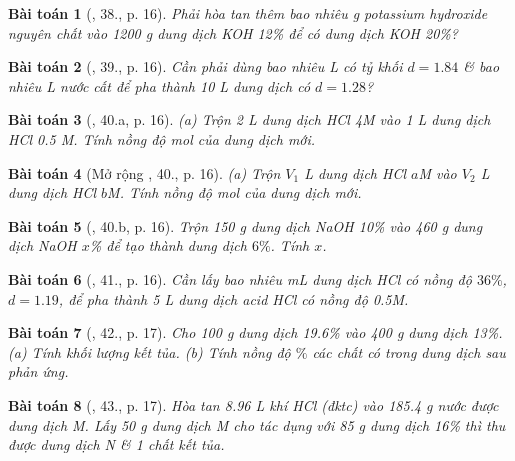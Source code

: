 \documentclass{article}
\newtheorem{baitoan}{Bài toán}
\begin{document}
\begin{baitoan}[\cite{An_400_BT_Hoa_Hoc_9}, 38., p. 16]
	Phải hòa tan thêm bao nhiêu {\rm g} potassium hydroxide nguyên chất vào {\rm1200 g} dung dịch {\rm KOH 12\%} để có dung dịch {\rm KOH 20\%}?
\end{baitoan}

\begin{baitoan}[\cite{An_400_BT_Hoa_Hoc_9}, 39., p. 16]
	Cần phải dùng bao nhiêu {\rm L } có tỷ khối $d = 1.84$ \& bao nhiêu {\rm L} nước cất để pha thành {\rm10 L} dung dịch {\rm{}} có $d = 1.28$?
\end{baitoan}

\begin{baitoan}[\cite{An_400_BT_Hoa_Hoc_9}, 40.a, p. 16]
	(a) Trộn {\rm2 L} dung dịch {\rm HCl 4M} vào {\rm 1 L} dung dịch {\rm HCl 0.5 M}. Tính nồng độ mol của dung dịch mới.
\end{baitoan}

\begin{baitoan}[Mở rộng \cite{An_400_BT_Hoa_Hoc_9}, 40., p. 16]
	(a) Trộn $V_1$ {\rm L} dung dịch {\rm HCl $a$M} vào $V_2$ {\rm L} dung dịch {\rm HCl $b$M}. Tính nồng độ mol của dung dịch mới.
\end{baitoan}

\begin{baitoan}[\cite{An_400_BT_Hoa_Hoc_9}, 40.b, p. 16]
	Trộn {\rm150 g} dung dịch {\rm NaOH 10\%} vào {\rm460 g} dung dịch {\rm NaOH $x$\%} để tạo thành dung dịch $6\%$. Tính $x$.
\end{baitoan}

\begin{baitoan}[\cite{An_400_BT_Hoa_Hoc_9}, 41., p. 16]
	Cần lấy bao nhiêu {\rm mL} dung dịch {\rm HCl} có nồng độ $36\%$, $d = 1.19$, để pha thành {\rm5 L} dung dịch acid {\rm HCl} có nồng độ {\rm0.5M}.
\end{baitoan}

\begin{baitoan}[\cite{An_400_BT_Hoa_Hoc_9}, 42., p. 17]
	Cho {\rm100 g} dung dịch {\rm{} 19.6\%} vào {\rm400 g} dung dịch {\rm{} 13\%}. (a) Tính khối lượng kết tủa. (b) Tính nồng độ $\%$ các chất có trong dung dịch sau phản ứng.
\end{baitoan}

\begin{baitoan}[\cite{An_400_BT_Hoa_Hoc_9}, 43., p. 17]
	Hòa tan {\rm8.96 L} khí {\rm HCl} (đktc) vào {\rm185.4 g} nước được dung dịch M. Lấy {\rm50 g} dung dịch M cho tác dụng với {\rm85 g} dung dịch {\rm{} 16\%} thì thu được dung dịch N \& 1 chất kết tủa.
\end{baitoan}
\end{document}
